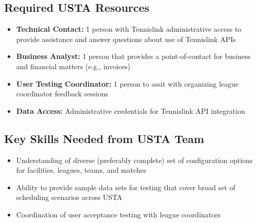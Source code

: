 \subsection{Required USTA Resources}
\begin{itemize}
    \item \textbf{Technical Contact:} 1 person with Tennislink administrative access to provide assistance and answer questions about use of Tennislink APIs
    \item \textbf{Business Analyst:} 1 person that provides a point-of-contact for business and financial matters (e.g., invoices)
    \item \textbf{User Testing Coordinator:} 1 person to assit with organizing league coordinator feedback sessions
    \item \textbf{Data Access:} Administrative credentials for Tennislink API integration
\end{itemize}

\subsection{Key Skills Needed from USTA Team}
\begin{itemize}
    \item Understanding of diverse (preferably complete) set of configuration options for facilities, leagues, teams, and matches
    \item Ability to provide sample data sets for testing that cover broad set of scheduling scenarios across USTA
    \item Coordination of user acceptance testing with league coordinators
\end{itemize}